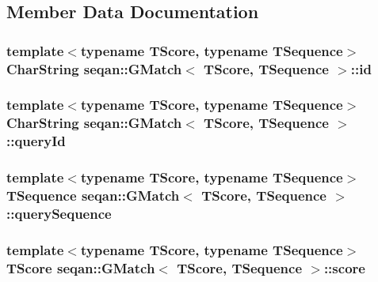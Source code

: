 \subsection{Member Data Documentation}
\hypertarget{structseqan_1_1_g_match_ae4eac560a806ad0771f1aea4106ffd0d}{
\subsubsection[{id}]{\setlength{\rightskip}{0pt plus 5cm}template$<$typename T\-Score, typename T\-Sequence$>$ Char\-String {\bf seqan\-::\-G\-Match}$<$ T\-Score, T\-Sequence $>$\-::id}}\label{structseqan_1_1_g_match_ae4eac560a806ad0771f1aea4106ffd0d}
\hypertarget{structseqan_1_1_g_match_a49524158acebda7f2aa2711fa675fe5a}{
\subsubsection[{query\-Id}]{\setlength{\rightskip}{0pt plus 5cm}template$<$typename T\-Score, typename T\-Sequence$>$ Char\-String {\bf seqan\-::\-G\-Match}$<$ T\-Score, T\-Sequence $>$\-::query\-Id}}\label{structseqan_1_1_g_match_a49524158acebda7f2aa2711fa675fe5a}
\hypertarget{structseqan_1_1_g_match_a5bf1edefeece4584350a5d8b51bf5931}{
\subsubsection[{query\-Sequence}]{\setlength{\rightskip}{0pt plus 5cm}template$<$typename T\-Score, typename T\-Sequence$>$ T\-Sequence {\bf seqan\-::\-G\-Match}$<$ T\-Score, T\-Sequence $>$\-::query\-Sequence}}\label{structseqan_1_1_g_match_a5bf1edefeece4584350a5d8b51bf5931}
\hypertarget{structseqan_1_1_g_match_a167782c90ebf893b4ed14dec10751e2d}{
\subsubsection[{score}]{\setlength{\rightskip}{0pt plus 5cm}template$<$typename T\-Score, typename T\-Sequence$>$ T\-Score {\bf seqan\-::\-G\-Match}$<$ T\-Score, T\-Sequence $>$\-::score}}\label{structseqan_1_1_g_match_a167782c90ebf893b4ed14dec10751e2d}
